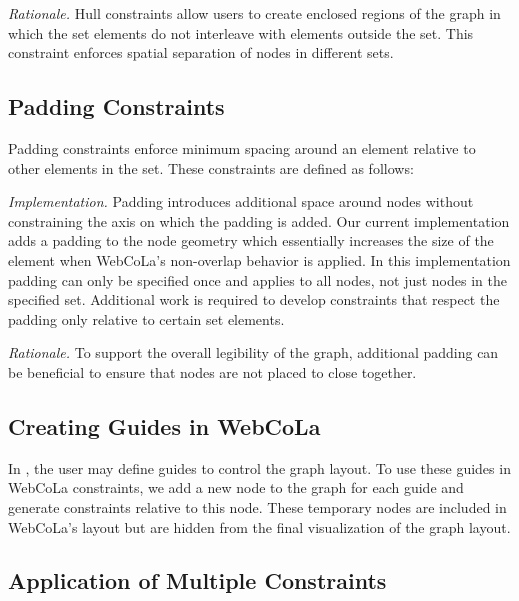 \emph{Rationale.}
Hull constraints allow users to create enclosed regions of the graph in
which the set elements do not interleave with elements outside the set. This
constraint enforces spatial separation of nodes in different sets.


\subsection{Padding Constraints}

Padding constraints enforce minimum spacing around an element relative
to other elements in the set. These constraints are defined as follows:


\emph{Implementation.}
Padding introduces additional space around nodes without constraining the
axis on which the padding is added. Our current implementation adds a
padding to the node geometry which essentially increases the size of the element
when WebCoLa's non-overlap behavior is applied. In this implementation
padding can only be specified once and applies to all nodes, not just nodes
in the specified set. Additional work is required to develop constraints that
respect the padding only relative to certain set elements.


\emph{Rationale.}
To support the overall legibility of the graph, additional padding can be
beneficial to ensure that nodes are not placed to close together.

\subsection{Creating Guides in WebCoLa}

In \projectname, the user may define guides to control the graph layout.
To use these guides in WebCoLa constraints, we add a new node to the graph
for each guide and generate constraints relative to this node. These 
temporary nodes are included in WebCoLa's layout but are hidden from the
final visualization of the graph layout.

\subsection{Application of Multiple Constraints}
